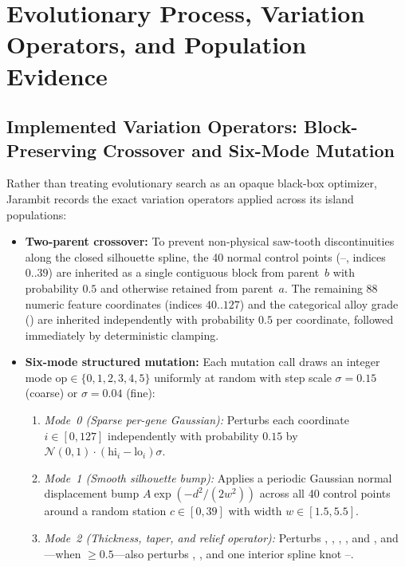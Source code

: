 \section{Evolutionary Process, Variation Operators, and Population Evidence}
\label{sec:evolution}

\subsection{Implemented Variation Operators: Block-Preserving Crossover and Six-Mode Mutation}
Rather than treating evolutionary search as an opaque black-box optimizer, Jarambit records the exact variation operators applied across its island populations:
\begin{itemize}[leftmargin=*,nosep]
\item \textbf{Two-parent crossover:} To prevent non-physical saw-tooth discontinuities along the closed silhouette spline, the 40 normal control points (--, indices $0..39$) are inherited as a single contiguous block from parent~$b$ with probability $0.5$ and otherwise retained from parent~$a$. The remaining 88 numeric feature coordinates (indices $40..127$) and the categorical alloy grade () are inherited independently with probability $0.5$ per coordinate, followed immediately by deterministic clamping.
\item \textbf{Six-mode structured mutation:} Each mutation call draws an integer mode $\text{op}\in\{0,1,2,3,4,5\}$ uniformly at random with step scale $\sigma=0.15$ (coarse) or $\sigma=0.04$ (fine):
  \begin{enumerate}[leftmargin=*,nosep]
  \item \emph{Mode~0 (Sparse per-gene Gaussian):} Perturbs each coordinate $i\in[0,127]$ independently with probability $0.15$ by $\mathcal{N}(0,1)\cdot(\text{hi}_i-\text{lo}_i)\sigma$.
  \item \emph{Mode~1 (Smooth silhouette bump):} Applies a periodic Gaussian normal displacement bump $A\exp(-d^2/(2w^2))$ across all 40 control points around a random station $c\in[0,39]$ with width $w\in[1.5,5.5]$.
  \item \emph{Mode~2 (Thickness, taper, and relief operator):} Perturbs , , , , and , and---when  $\ge 0.5$---also perturbs , , and one interior spline knot --.

\end{enumerate}
\end{itemize}
